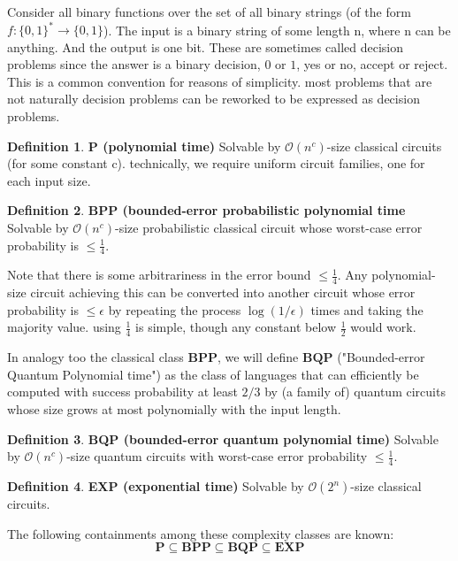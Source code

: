 \documentclass[12pt, oneside]{book}
\theoremstyle{definition}
\newtheorem{definition}{Definition}[section]
\theoremstyle{definition}
\theoremstyle{remark}
\begin{document}
Consider all binary functions over the set of all binary strings (of the form $f:\{0,1\}^*\rightarrow \{0,1\}$). The input is a binary string of some length n, where n can be anything. And the output is one bit. These are sometimes called decision problems since the answer is a binary decision, $0$ or $1$, yes or no, accept or reject. This is a common convention for reasons of simplicity. most problems that are not naturally decision problems can be reworked to be expressed as decision problems.

\begin{definition}
    \textbf{P (polynomial time)} Solvable by $\mathcal{O}(n^c)$-size classical circuits (for some constant c). technically, we require uniform circuit families, one for each input size.
\end{definition}

\begin{definition}
    \textbf{BPP (bounded-error probabilistic polynomial time} Solvable by $\mathcal{O}(n^c)$-size probabilistic classical circuit whose worst-case error probability is $\leq \frac{1}{4}$.
\end{definition}
Note that there is some arbitrariness in the error bound $\leq \frac{1}{4}$. Any polynomial-size circuit achieving this can be converted into another circuit whose error probability is $\leq \epsilon$ by repeating the process $\log(1/\epsilon)$ times and taking the majority value. using $\frac{1}{4}$ is simple, though any constant below $\frac{1}{2}$ would work.

In analogy too the classical class $\mathbf{BPP}$, we will define $\mathbf{BQP}$ ("Bounded-error Quantum Polynomial time") as the class of languages that can efficiently be computed with success probability at least $2/3$ by (a family of) quantum circuits whose size grows at most polynomially with the input length.
\begin{definition}
    \textbf{BQP (bounded-error quantum polynomial time)} Solvable by $\mathcal{O}(n^c)$-size quantum circuits with worst-case error probability $\leq \frac{1}{4}$.
\end{definition}

\begin{definition}
    \textbf{EXP (exponential time)} Solvable by $\mathcal{O}(2^n)$-size classical circuits.
\end{definition}

The following containments among these complexity classes are known:
\[
\mathbf{P}\subseteq \mathbf{BPP} \subseteq \mathbf{BQP} \subseteq \mathbf{EXP}
\]
\end{document}
